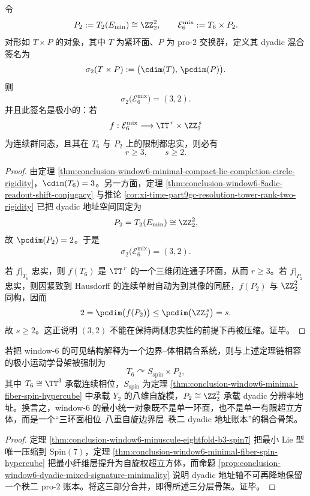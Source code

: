 \begin{proposition}\label{prop:conclusion-window6-dyadic-mixed-signature-minimality}
令
\[
P_2:=T_2(E_{\min})\cong \ZZ_2^2,
\qquad
\mathcal E_6^{\mathrm{mix}}:=T_6\times P_2.
\]
对形如 \(T\times P\) 的对象，其中 \(T\) 为紧环面、\(P\) 为 pro-\(2\) 交换群，定义其 dyadic 混合签名为
\[
\sigma_2(T\times P):=\bigl(\cdim(T),\,\pcdim(P)\bigr).
\]
则
\[
\sigma_2\bigl(\mathcal E_6^{\mathrm{mix}}\bigr)=(3,2).
\]
并且此签名是极小的：若
\[
f:\mathcal E_6^{\mathrm{mix}}
\longrightarrow
\TT^{\,r}\times \ZZ_2^{\,s}
\]
为连续群同态，且其在 \(T_6\) 与 \(P_2\) 上的限制都忠实，则必有
\[
r\ge 3,
\qquad
s\ge 2.
\]
\end{proposition}
\begin{proof}
由定理 \ref{thm:conclusion-window6-minimal-compact-lie-completion-circle-rigidity}，\(\cdim(T_6)=3\)。另一方面，定理 \ref{thm:conclusion-window6-8adic-readout-shift-conjugacy} 与推论 \ref{cor:xi-time-part9gc-resolution-tower-rank-two-rigidity} 已把 dyadic 地址空间固定为
\[
P_2=T_2(E_{\min})\cong \ZZ_2^2,
\]
故 \(\pcdim(P_2)=2\)。于是
\[
\sigma_2\bigl(\mathcal E_6^{\mathrm{mix}}\bigr)=(3,2).
\]

若 \(f|_{T_6}\) 忠实，则 \(f(T_6)\) 是 \(\TT^{\,r}\) 的一个三维闭连通子环面，从而 \(r\ge 3\)。若 \(f|_{P_2}\) 忠实，则因紧致到 Hausdorff 的连续单射自动为到其像的同胚，\(f(P_2)\) 与 \(\ZZ_2^2\) 同构，因而
\[
2=\pcdim\bigl(f(P_2)\bigr)\le \pcdim\bigl(\ZZ_2^{\,s}\bigr)=s.
\]
故 \(s\ge 2\)。这正说明 \((3,2)\) 不能在保持两侧忠实性的前提下再被压缩。证毕。
\end{proof}

\begin{corollary}[物理骨架的强制三分层]\label{cor:conclusion-window6-physical-skeleton-forced-stratification}
若把 window-\(6\) 的可见结构解释为一个边界--体相耦合系统，则与上述定理链相容的极小运动学骨架被强制为
\[
T_6\curvearrowright S_{\mathrm{spin}}\times P_2,
\]
其中 \(T_6\cong \TT^3\) 承载连续相位，\(S_{\mathrm{spin}}\) 为定理 \ref{thm:conclusion-window6-minimal-fiber-spin-hypercube} 中承载 \(Y_2\) 的八维自旋模，\(P_2\cong \ZZ_2^2\) 承载 dyadic 分辨率地址。换言之，window-\(6\) 的最小统一对象既不是单一环面，也不是单一有限超立方体，而是一个“三环面相位--八重自旋边界层--秩二 dyadic 地址账本”的耦合骨架。
\end{corollary}
\begin{proof}
定理 \ref{thm:conclusion-window6-minuscule-eightfold-b3-spin7} 把最小 Lie 型唯一压缩到 \(\mathrm{Spin}(7)\)，定理 \ref{thm:conclusion-window6-minimal-fiber-spin-hypercube} 把最小纤维层提升为自旋权超立方体，而命题 \ref{prop:conclusion-window6-dyadic-mixed-signature-minimality} 说明 dyadic 地址轴不可再降地保留一个秩二 pro-\(2\) 账本。将这三部分合并，即得所述三分层骨架。证毕。
\end{proof}

